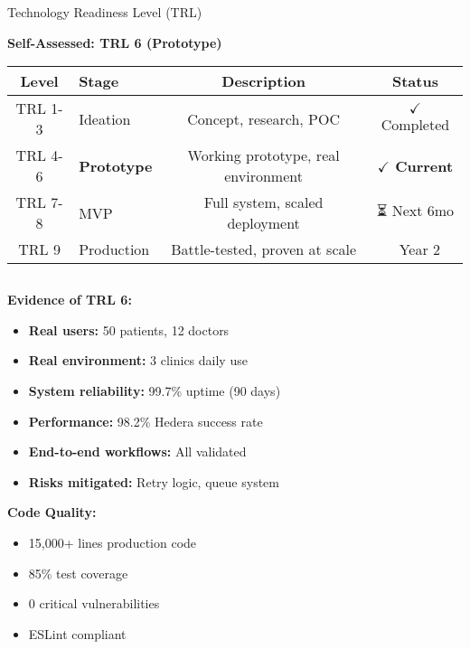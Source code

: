 \documentclass[aspectratio=169,xcolor=dvipsnames,14pt]{beamer}
\newcommand{\checkitem}{\item[\color{SuccessGreen}\faCheckCircle]}
\begin{document}
\begin{frame}{Technology Readiness Level (TRL)}

  \textbf{\textcolor{HederaPurple}{Self-Assessed: TRL 6 (Prototype)}}

  \begin{table}
    \small
    \begin{tabular}{clcc}
      \toprule
      \textbf{Level} & \textbf{Stage} & \textbf{Description} & \textbf{Status} \\
      \midrule
      TRL 1-3 & Ideation & Concept, research, POC & \textcolor{SuccessGreen}{$\checkmark$ Completed} \\
      TRL 4-6 & \textbf{Prototype} & Working prototype, real environment & \textcolor{SuccessGreen}{\textbf{$\checkmark$ Current}} \\
      TRL 7-8 & MVP & Full system, scaled deployment & \textcolor{WarningOrange}{⏳ Next 6mo} \\
      TRL 9 & Production & Battle-tested, proven at scale & \textcolor{FadjmaBlue}{🎯 Year 2} \\
      \bottomrule
    \end{tabular}
  \end{table}

  \vspace{0.3cm}

  \begin{columns}[T]
    \begin{column}{0.5\textwidth}
      \textbf{Evidence of TRL 6:}

      \begin{itemize}
        \checkitem \textbf{Real users:} 50 patients, 12 doctors
        \checkitem \textbf{Real environment:} 3 clinics daily use
        \checkitem \textbf{System reliability:} 99.7\% uptime (90 days)
        \checkitem \textbf{Performance:} 98.2\% Hedera success rate
        \checkitem \textbf{End-to-end workflows:} All validated
        \checkitem \textbf{Risks mitigated:} Retry logic, queue system
      \end{itemize}

      \vspace{0.2cm}

      \textbf{Code Quality:}
      \begin{itemize}
        \item 15,000+ lines production code
        \item 85\% test coverage
        \item 0 critical vulnerabilities
        \item ESLint compliant
      \end{itemize}
    \end{column}


\end{columns}
\end{frame}
\end{document}
